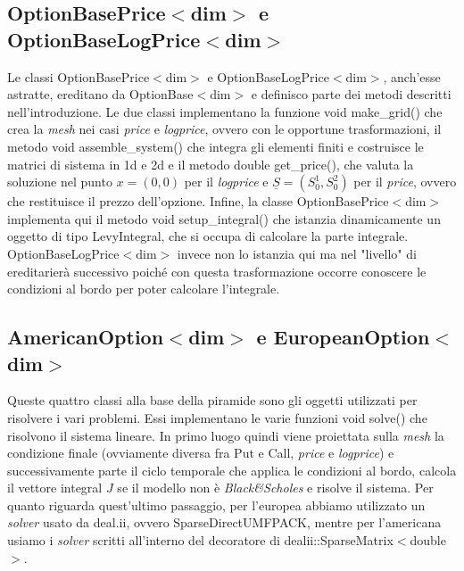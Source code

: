 \documentclass[a4paper,10pt]{report}
\theoremstyle{plain}
\theoremstyle{definition}
\theoremstyle{remark}
\begin{document}
\subsection{\textsf{OptionBasePrice$<$dim$>$} e \textsf{OptionBaseLogPrice$<$dim$>$}}
Le classi \textsf{OptionBasePrice$<$dim$>$} e \textsf{OptionBaseLogPrice$<$dim$>$}, anch'esse astratte, ereditano da \textsf{OptionBase$<$dim$>$} e definisco parte dei metodi descritti nell'introduzione. Le due classi implementano la funzione \textsf{void make\_grid()} che crea la \emph{mesh} nei casi \emph{price} e \emph{logprice}, ovvero con le opportune trasformazioni, il metodo \textsf{void assemble\_system()} che integra gli elementi finiti e costruisce le matrici di sistema in 1d e 2d e il metodo \textsf{double get\_price()}, che valuta la soluzione nel punto $x=(0,0)$ per il \emph{logprice} e $\underline{S}=(S_0^1, S_0^2)$ per il \emph{price}, ovvero che restituisce il prezzo dell'opzione. Infine, la classe \textsf{OptionBasePrice$<$dim$>$} implementa qui il metodo \textsf{void setup\_integral()} che istanzia dinamicamente un oggetto di tipo \textsf{LevyIntegral}, che si occupa di calcolare la parte integrale. \textsf{OptionBaseLogPrice$<$dim$>$} invece non lo istanzia qui ma nel "livello" di ereditarier\`a successivo poich\'e con questa trasformazione occorre conoscere le condizioni al bordo per poter calcolare l'integrale.
\subsection{\textsf{AmericanOption$<$dim$>$} e \textsf{EuropeanOption$<$dim$>$}}
Queste quattro classi alla base della piramide sono gli oggetti utilizzati per risolvere i vari problemi. Essi implementano le varie funzioni \textsf{void solve()} che risolvono il sistema lineare. In primo luogo quindi viene proiettata sulla \emph{mesh} la condizione finale (ovviamente diversa fra Put e Call, \emph{price} e \emph{logprice}) e successivamente parte il ciclo temporale che applica le condizioni al bordo, calcola il vettore integral $J$ se il modello non \`e \emph{Black\&Scholes} e risolve il sistema. Per quanto riguarda quest'ultimo passaggio, per l'europea abbiamo utilizzato un \emph{solver} usato da \textsf{deal.ii}, ovvero \textsf{SparseDirectUMFPACK}, mentre per l'americana usiamo i \emph{solver} scritti all'interno del decoratore di \textsf{dealii::SparseMatrix$<$double$>$}.

\end{document}
